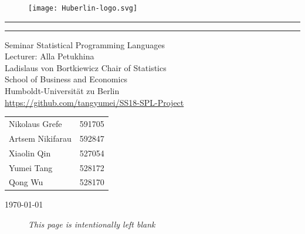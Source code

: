 \documentclass[a4paper,12pt,fleqn]{article}
\begin{document}
\begin{titlepage}
	\thispagestyle{plain}
	\begin{figure}[h]
		\centering
		\texttt{[image: Huberlin-logo.svg]}
	\end{figure}
\hrule
 \vspace{10pt}
 \vspace{10pt}
\hrule
\vspace{50pt}
{\Large Seminar Statistical Programming Languages}\\[10pt]
{\Large Lecturer: Alla Petukhina}\\[10pt]
{\Large Ladislaus von Bortkiewicz Chair of Statistics}\\ 
{\large School of Business and Economics}\\  
{\large Humboldt-Universit\"{a}t zu Berlin \vspace{30pt}}\\
\url{https://github.com/tangyumei/SS18-SPL-Project}\\[30pt]
\begin{tabular}{lr}
	Nikolaus Grefe & 591705\\
	Artsem Nikifarau & 592847 \\
	Xiaolin Qin & 527054\\
	Yumei Tang & 528172\\
	Qong Wu & 528170\\	
\end{tabular}

\vspace{50pt}
\today
{}
\end{titlepage}



\newpage
{}
\setcounter{tocdepth}{3}
\tableofcontents





\newpage
{}
\listoftables


\listoffigures




\newpage\null\thispagestyle{empty}
\vspace{\fill}
\begin{figure}[h]
	\centering
\emph{This page is intentionally left blank}
\end{figure}
\vspace{\fill}
\newpage
{}
\end{document}
